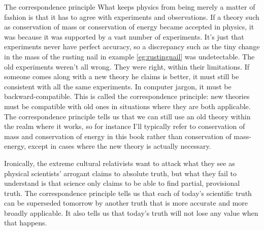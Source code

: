 \begin{envsubsection}{The correspondence principle}
What keeps physics from being merely a matter of fashion is that it has to agree
with experiments and observations. If a theory such as conservation of mass or
conservation of energy became accepted in physics, it was because it was supported
by a vast number of experiments. It's just that experiments never have perfect
accuracy, so a discrepancy such as the tiny change in the mass of the rusting nail
in example \ref{eg:rustingnail} was undetectable. The old experiments weren't all
wrong. They were right, within their limitations. If someone comes along with a
new theory he claims is better, it must still be consistent with all the same
experiments. In computer jargon, it must be backward-compatible. This is called
the correspondence principle: new theories must be compatible with old ones in
situations where they are both applicable. The correspondence principle tells us
that we can still use an old theory within the realm where it works, so for instance
I'll typically refer to conservation of mass and conservation of energy in this
book rather than conservation of mass-energy, except in cases where the new theory
is actually necessary.

Ironically, the extreme cultural relativists want to attack what they see
as physical scientists' arrogant claims to absolute truth, but what they
fail to understand is that science only claims to be able to find partial, provisional truth.
The correspondence principle tells us that each of today's scientific truth can be superseded
tomorrow by another truth that is more accurate and more broadly applicable. It also
tells us that today's truth will not lose any value when that happens.
\end{envsubsection}



